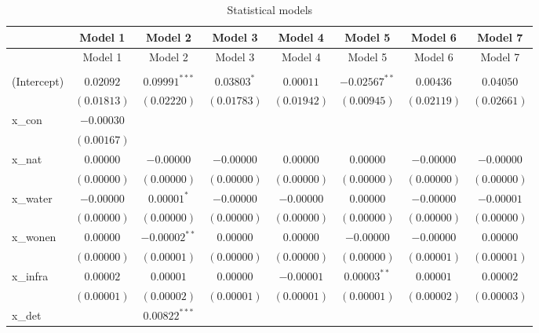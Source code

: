 
\begin{center}
\begin{longtable}{l c c c c c c c }
\hline
 & Model 1 & Model 2 & Model 3 & Model 4 & Model 5 & Model 6 & Model 7 \\
\hline
\endfirsthead
\hline
 & Model 1 & Model 2 & Model 3 & Model 4 & Model 5 & Model 6 & Model 7 \\
\hline
\endhead
\hline
\endfoot
\hline
\multicolumn{8}{l}{\scriptsize{$^{***}p<0.001$, $^{**}p<0.01$, $^*p<0.05$}}\\
\caption{Statistical models}
\label{table:coefficients}
\endlastfoot
(Intercept) & $0.02092$   & $0.09991^{***}$ & $0.03803^{*}$ & $0.00011$   & $-0.02567^{**}$ & $0.00436$   & $0.04050$   \\
            & $(0.01813)$ & $(0.02220)$     & $(0.01783)$   & $(0.01942)$ & $(0.00945)$     & $(0.02119)$ & $(0.02661)$ \\
x\_con      & $-0.00030$  &                 &               &             &                 &             &             \\
            & $(0.00167)$ &                 &               &             &                 &             &             \\
x\_nat      & $0.00000$   & $-0.00000$      & $-0.00000$    & $0.00000$   & $0.00000$       & $-0.00000$  & $-0.00000$  \\
            & $(0.00000)$ & $(0.00000)$     & $(0.00000)$   & $(0.00000)$ & $(0.00000)$     & $(0.00000)$ & $(0.00000)$ \\
x\_water    & $-0.00000$  & $0.00001^{*}$   & $-0.00000$    & $-0.00000$  & $0.00000$       & $-0.00000$  & $-0.00001$  \\
            & $(0.00000)$ & $(0.00000)$     & $(0.00000)$   & $(0.00000)$ & $(0.00000)$     & $(0.00000)$ & $(0.00000)$ \\
x\_wonen    & $0.00000$   & $-0.00002^{**}$ & $0.00000$     & $0.00000$   & $-0.00000$      & $-0.00000$  & $0.00000$   \\
            & $(0.00000)$ & $(0.00001)$     & $(0.00000)$   & $(0.00000)$ & $(0.00000)$     & $(0.00001)$ & $(0.00001)$ \\
x\_infra    & $0.00002$   & $0.00001$       & $0.00000$     & $-0.00001$  & $0.00003^{**}$  & $0.00001$   & $0.00002$   \\
            & $(0.00001)$ & $(0.00002)$     & $(0.00001)$   & $(0.00001)$ & $(0.00001)$     & $(0.00002)$ & $(0.00003)$ \\
x\_det      &             & $0.00822^{***}$ &               &             &                 &             &             \\

\end{longtable}
\end{center}
